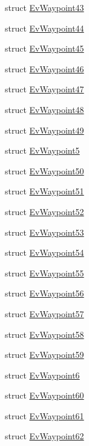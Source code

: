 \begin{DoxyCompactItemize}
struct \hyperlink{structcl__move__base__z_1_1EvWaypoint43}{Ev\+Waypoint43}
\item 
struct \hyperlink{structcl__move__base__z_1_1EvWaypoint44}{Ev\+Waypoint44}
\item 
struct \hyperlink{structcl__move__base__z_1_1EvWaypoint45}{Ev\+Waypoint45}
\item 
struct \hyperlink{structcl__move__base__z_1_1EvWaypoint46}{Ev\+Waypoint46}
\item 
struct \hyperlink{structcl__move__base__z_1_1EvWaypoint47}{Ev\+Waypoint47}
\item 
struct \hyperlink{structcl__move__base__z_1_1EvWaypoint48}{Ev\+Waypoint48}
\item 
struct \hyperlink{structcl__move__base__z_1_1EvWaypoint49}{Ev\+Waypoint49}
\item 
struct \hyperlink{structcl__move__base__z_1_1EvWaypoint5}{Ev\+Waypoint5}
\item 
struct \hyperlink{structcl__move__base__z_1_1EvWaypoint50}{Ev\+Waypoint50}
\item 
struct \hyperlink{structcl__move__base__z_1_1EvWaypoint51}{Ev\+Waypoint51}
\item 
struct \hyperlink{structcl__move__base__z_1_1EvWaypoint52}{Ev\+Waypoint52}
\item 
struct \hyperlink{structcl__move__base__z_1_1EvWaypoint53}{Ev\+Waypoint53}
\item 
struct \hyperlink{structcl__move__base__z_1_1EvWaypoint54}{Ev\+Waypoint54}
\item 
struct \hyperlink{structcl__move__base__z_1_1EvWaypoint55}{Ev\+Waypoint55}
\item 
struct \hyperlink{structcl__move__base__z_1_1EvWaypoint56}{Ev\+Waypoint56}
\item 
struct \hyperlink{structcl__move__base__z_1_1EvWaypoint57}{Ev\+Waypoint57}
\item 
struct \hyperlink{structcl__move__base__z_1_1EvWaypoint58}{Ev\+Waypoint58}
\item 
struct \hyperlink{structcl__move__base__z_1_1EvWaypoint59}{Ev\+Waypoint59}
\item 
struct \hyperlink{structcl__move__base__z_1_1EvWaypoint6}{Ev\+Waypoint6}
\item 
struct \hyperlink{structcl__move__base__z_1_1EvWaypoint60}{Ev\+Waypoint60}
\item 
struct \hyperlink{structcl__move__base__z_1_1EvWaypoint61}{Ev\+Waypoint61}
\item 
struct \hyperlink{structcl__move__base__z_1_1EvWaypoint62}{Ev\+Waypoint62}

\end{DoxyCompactItemize}
